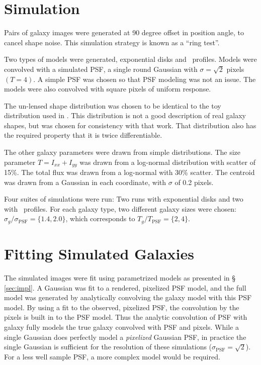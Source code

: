 \documentclass[12pt,preprint]{aastex}
\begin{document}
\section{Simulation} \label{sec:sim}

Pairs of galaxy images were generated at 90 degree offset in position
angle, to cancel shape noise.  This simulation strategy is known as
a ``ring test''\citep{Nakajima2007}.

Two types of models were generated, exponential disks and \devauc\ profiles.
Models were convolved with a simulated PSF, a single round Gaussian with
$\sigma = \sqrt{2}$ pixels $(T=4)$.  A simple PSF was chosen so that PSF
modeling was not an issue.  The models were also convolved with square pixels
of uniform response.

The un-lensed shape distribution was chosen to be identical to the toy
distribution used in \cite{ba13}.  This distribution is not a good description
of real galaxy shapes, but was chosen for consistency with that work.  That
distribution also has the required property that it is twice differentiable.

The other galaxy parameters were drawn from simple distributions.  The size
parameter $T=I_{xx} + I_{yy}$ was drawn from a log-normal distribution with
scatter of 15\%.  The total flux was drawn from a log-normal with 30\% scatter.
The centroid was drawn from a Gaussian in each coordinate, with $\sigma$ of 0.2
pixels.

Four suites of simulations were run:  Two runs with exponential disks and two
with \devauc\ profiles.  For each galaxy type, two different galaxy sizes were
chosen: $\sigma_{g}/\sigma_{\textrm{PSF}} = \{1.4,2.0\}$, which corresponds to
$T_{g}/T_{\textrm{PSF}} =\{2,4\}$.


\section{Fitting Simulated Galaxies} \label{sec:simfit}

The simulated images were fit using parametrized models as presented in \S
\ref{sec:impl}.   A Gaussian was fit to a rendered, pixelized PSF model, and
the full model was generated by analytically convolving the galaxy model with
this PSF model. By using a fit to the observed, pixelized PSF, the convolution
by the pixels is built in to the PSF model. Thus the analytic convolution of
PSF with galaxy fully models the true galaxy convolved with PSF and pixels.
While a single Gaussian does perfectly model a {\it pixelized} Gaussian PSF, in
practice the single Gaussian is sufficient for the resolution of these
simulations ($\sigma_{\textrm{PSF}}=\sqrt{2}$).  For a less well sample PSF, a
more complex model would be required.
\end{document}
